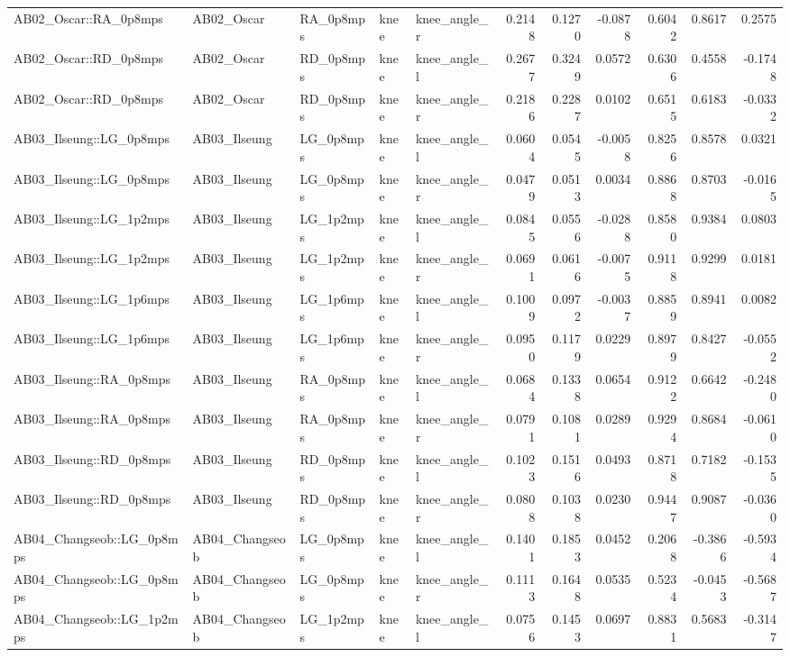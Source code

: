 \begin{table}
\begin{tabular}{lllllrrrrrr}
AB02_Oscar::RA_0p8mps & AB02_Oscar & RA_0p8mps & knee & knee_angle_r & 0.2148 & 0.1270 & -0.0878 & 0.6042 & 0.8617 & 0.2575 \\
AB02_Oscar::RD_0p8mps & AB02_Oscar & RD_0p8mps & knee & knee_angle_l & 0.2677 & 0.3249 & 0.0572 & 0.6306 & 0.4558 & -0.1748 \\
AB02_Oscar::RD_0p8mps & AB02_Oscar & RD_0p8mps & knee & knee_angle_r & 0.2186 & 0.2287 & 0.0102 & 0.6515 & 0.6183 & -0.0332 \\
AB03_Ilseung::LG_0p8mps & AB03_Ilseung & LG_0p8mps & knee & knee_angle_l & 0.0604 & 0.0545 & -0.0058 & 0.8256 & 0.8578 & 0.0321 \\
AB03_Ilseung::LG_0p8mps & AB03_Ilseung & LG_0p8mps & knee & knee_angle_r & 0.0479 & 0.0513 & 0.0034 & 0.8868 & 0.8703 & -0.0165 \\
AB03_Ilseung::LG_1p2mps & AB03_Ilseung & LG_1p2mps & knee & knee_angle_l & 0.0845 & 0.0556 & -0.0288 & 0.8580 & 0.9384 & 0.0803 \\
AB03_Ilseung::LG_1p2mps & AB03_Ilseung & LG_1p2mps & knee & knee_angle_r & 0.0691 & 0.0616 & -0.0075 & 0.9118 & 0.9299 & 0.0181 \\
AB03_Ilseung::LG_1p6mps & AB03_Ilseung & LG_1p6mps & knee & knee_angle_l & 0.1009 & 0.0972 & -0.0037 & 0.8859 & 0.8941 & 0.0082 \\
AB03_Ilseung::LG_1p6mps & AB03_Ilseung & LG_1p6mps & knee & knee_angle_r & 0.0950 & 0.1179 & 0.0229 & 0.8979 & 0.8427 & -0.0552 \\
AB03_Ilseung::RA_0p8mps & AB03_Ilseung & RA_0p8mps & knee & knee_angle_l & 0.0684 & 0.1338 & 0.0654 & 0.9122 & 0.6642 & -0.2480 \\
AB03_Ilseung::RA_0p8mps & AB03_Ilseung & RA_0p8mps & knee & knee_angle_r & 0.0791 & 0.1081 & 0.0289 & 0.9294 & 0.8684 & -0.0610 \\
AB03_Ilseung::RD_0p8mps & AB03_Ilseung & RD_0p8mps & knee & knee_angle_l & 0.1023 & 0.1516 & 0.0493 & 0.8718 & 0.7182 & -0.1535 \\
AB03_Ilseung::RD_0p8mps & AB03_Ilseung & RD_0p8mps & knee & knee_angle_r & 0.0808 & 0.1038 & 0.0230 & 0.9447 & 0.9087 & -0.0360 \\
AB04_Changseob::LG_0p8mps & AB04_Changseob & LG_0p8mps & knee & knee_angle_l & 0.1401 & 0.1853 & 0.0452 & 0.2068 & -0.3866 & -0.5934 \\
AB04_Changseob::LG_0p8mps & AB04_Changseob & LG_0p8mps & knee & knee_angle_r & 0.1113 & 0.1648 & 0.0535 & 0.5234 & -0.0453 & -0.5687 \\
AB04_Changseob::LG_1p2mps & AB04_Changseob & LG_1p2mps & knee & knee_angle_l & 0.0756 & 0.1453 & 0.0697 & 0.8831 & 0.5683 & -0.3147 \\

\end{tabular}
\end{table}
